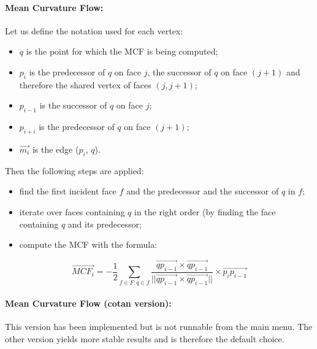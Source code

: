 \documentclass{article}
\begin{document}
\paragraph*{Mean Curvature Flow:}
Let us define the notation used for each vertex:
\begin{itemize}
  \item $q$ is the point for which the MCF is being computed;
  \item $p_i$ is the predecessor of $q$ on face $j$, the successor of $q$ on face $(j+1)$
    and therefore the shared vertex of faces $(j, j+1)$;
  \item $p_{i-1}$ is the successor of $q$ on face $j$;
  \item $p_{i+i}$ is the predecessor of $q$ on face $(j+1)$;
  \item $\overrightarrow{m_i}$ is the edge ($p_i$, $q$).
\end{itemize}
Then the following steps are applied:
\begin{itemize}
  \item find the first incident face $f$ and the predecessor and the successor of $q$ in $f$;
  \item iterate over faces containing $q$ in the right order (by finding the face
    containing $q$ and its predecessor;
  \item compute the MCF with the formula:
\end{itemize}
\begin{equation*}
  \overrightarrow{MCF_i} = -\frac{1}{2} \sum_{f \in F : q \in f}
    \frac{\overrightarrow{q p_{i-1}} \times \overrightarrow{q p_{i-1}}}
      {||\overrightarrow{q p_{i-1}} \times \overrightarrow{q p_{i-1}}||}
      \times \overrightarrow{p_i p_{i-1}}
\end{equation*}

\paragraph*{Mean Curvature Flow (cotan version):}
This version has been implemented but is not runnable from the main menu.
The other version yields more stable results and is therefore the default choice.
\end{document}
